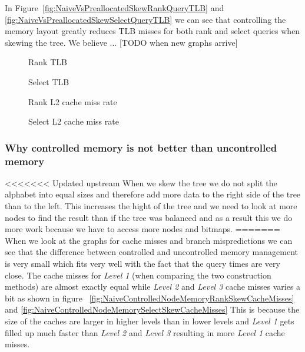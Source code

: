 In Figure~\ref{fig:NaiveVsPreallocatedSkewRankQueryTLB} and \ref{fig:NaiveVsPreallocatedSkewSelectQueryTLB} we can see that controlling the memory layout greatly reduces TLB misses for both rank and select queries when skewing the tree. We believe ... [TODO when new graphs arrive]

\begin{figure}
\caption{Rank TLB}
\label{fig:NaiveVsControlledNodeMemorySkewRankQueryTLB}

\end{figure}

\begin{figure}
\caption{Select TLB}
\label{fig:NaiveVsControlledNodeMemorySkewSelectQueryTLB}

\end{figure}


\begin{figure}
\caption{Rank L2 cache miss rate}
\label{fig:NaiveVsControlledNodeMemorySkewRankQuery_L2_DCMrate}

\end{figure}

\begin{figure}
\caption{Select L2 cache miss rate}
\label{fig:NaiveVsControlledNodeMemorySkewSelectQuery_L2_DCMrate}

\end{figure}




\subsubsection{Why controlled memory is not better than uncontrolled memory}
<<<<<<< Updated upstream
When we skew the tree we do not split the alphabet into equal sizes and therefore add more data to the right side of the tree than to the left. 
This increases the hight of the tree and we need to look at more nodes to find the result than if the tree was balanced and as a result this we do more work because we have to access more nodes and bitmaps.
=======
When we look at the graphs for cache misses and branch mispredictions we can see that the difference between controlled and uncontrolled memory management is very small which fits very well with the fact that the query times are very close.
The cache misses for \textit{Level 1} (when comparing the two construction methods) are almost exactly equal while \textit{Level 2} and \textit{Level 3} cache misses varies a bit as shown in figure ~\ref{fig:NaiveControlledNodeMemoryRankSkewCacheMisses} and \ref{fig:NaiveControlledNodeMemorySelectSkewCacheMisses}
This is because the size of the caches are larger in higher levels than in lower levels and \textit{Level 1} gets filled up much faster than \textit{Level 2} and \textit{Level 3} resulting in more \textit{Level 1} cache misses.

